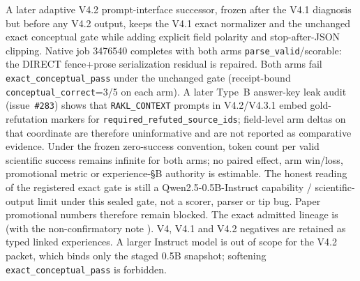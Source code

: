 A later adaptive V4.2 prompt-interface successor, frozen after the V4.1
diagnosis but before any V4.2 output, keeps the V4.1 exact normalizer and the
unchanged exact conceptual gate while adding explicit field polarity and
stop-after-JSON clipping.  Native job 3476540 completes with both arms
\texttt{parse\_valid}/scorable: the DIRECT fence+prose serialization residual
is repaired.  Both arms fail \texttt{exact\_conceptual\_pass} under the
unchanged gate (receipt-bound \texttt{conceptual\_correct}=3/5 on each arm).
A later Type~B answer-key leak audit (issue~\texttt{\#283}) shows that
\texttt{RAKL\_CONTEXT} prompts in V4.2/V4.3.1 embed gold-refutation markers for
\texttt{required\_refuted\_source\_ids}; field-level arm deltas on that
coordinate are therefore uninformative and are not reported as comparative
evidence.  Under the frozen zero-success convention, token count per valid
scientific success remains infinite for both arms; no paired effect, arm
win/loss, promotional metric or experience-\S{}B authority is estimable.
The honest reading of the registered exact gate is still a
Qwen2.5-0.5B-Instruct capability / scientific-output limit under this sealed
gate, not a scorer, parser or tip bug.  Paper promotional numbers therefore
remain blocked.  The exact admitted lineage is
(with the non-confirmatory note
).
V4, V4.1 and V4.2 negatives are retained as typed linked experiences.  A larger
Instruct model is out of scope for the V4.2 packet, which binds only the staged
0.5B snapshot; softening \texttt{exact\_conceptual\_pass} is forbidden.

